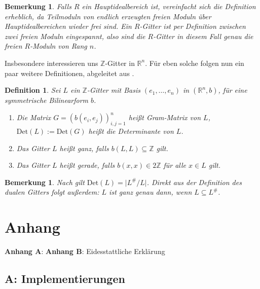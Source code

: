 \documentclass[12pt,a4paper,halfparskip,headsepline, bibtotocnumbered]{scrreprt}
\theoremstyle{nummermitklammern}
\newtheorem{definition}[defsatzusw]{Definition}
\newtheorem{bemerkung}[defsatzusw]{Bemerkung}
\theoremstyle{nonumberbreak}
\newcommand{\Z}{\mathbb{Z}}
\newcommand{\R}{\mathbb{R}}
\begin{document}
\begin{bemerkung}
	Falls $R$ ein Hauptidealbereich ist, vereinfacht sich die Definition erheblich, da Teilmoduln von endlich erzeugten freien Moduln über Hauptidealbereichen wieder frei sind. Ein $R$-Gitter ist per Definition zwischen zwei freien Moduln eingespannt, also sind die $R$-Gitter in diesem Fall genau die freien $R$-Moduln von Rang $n$.
\end{bemerkung}

Insbesondere interessieren uns $\Z$-Gitter in $\R^n$. Für eben solche folgen nun ein paar weitere Definitionen, abgeleitet aus \cite[Def. (1.7), (1.13), (14.7), (26.1)]{kneser}.

\begin{framed}
	\begin{definition}
		Sei $L$ ein $\Z$-Gitter mit Basis $(e_1, \dots, e_n)$ in $(\R^n, b)$, für eine symmetrische Bilinearform $b$.
		\begin{enumerate}[label=(\roman*)]
			\item Die Matrix $G = \left(b(e_i, e_j)\right)_{i,j=1}^n$ heißt \textit{Gram-Matrix} von $L$, $\text{Det}(L) := \text{Det}(G)$ heißt die \textit{Determinante} von $L$.
			\item Das Gitter $L$ heißt \textit{ganz}, falls $b(L,L) \subseteq \Z$ gilt.
			\item Das Gitter $L$ heißt \textit{gerade}, falls $b(x,x) \in 2\Z$ für alle $x \in L$ gilt.
		\end{enumerate}
	\end{definition}
\end{framed}

\begin{bemerkung}
	Nach \cite[Satz (14.7)]{kneser} gilt $\text{Det}(L) = \vert L^\# / L \vert$. Direkt aus der Definition des dualen Gitters folgt außerdem: $L$ ist ganz genau dann, wenn $L \subseteq L^\#$.
\end{bemerkung}




\newpage


\chapter{Anhang}

\textbf{Anhang A}: 
\textbf{Anhang B}: Eidesstattliche Erklärung

\section{A: Implementierungen}
\end{document}
